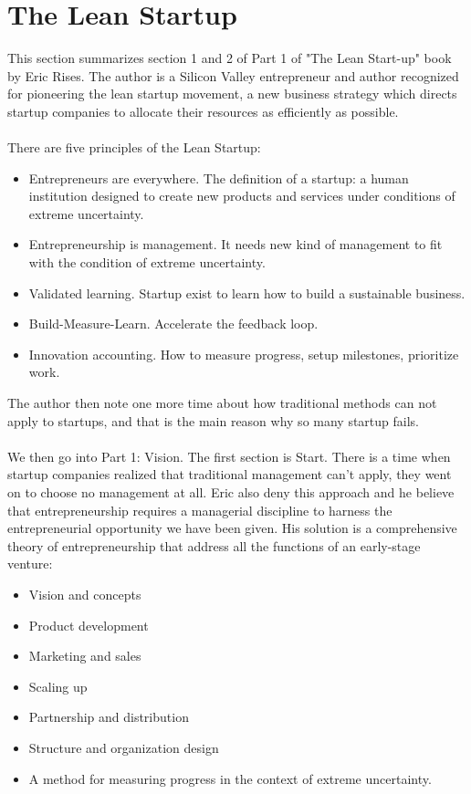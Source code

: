 \documentclass[a4paper, 11pt]{article} %
\begin{document}
\section*{The Lean Startup}
This section summarizes section 1 and 2 of Part 1 of "The Lean Start-up" book by Eric Rises. The author is a Silicon Valley entrepreneur and author recognized for pioneering the lean startup movement, a new business strategy which directs startup companies to allocate their resources as efficiently as possible.
\\
\\
There are five principles of the Lean Startup:
\begin{itemize}
\item{Entrepreneurs are everywhere. The definition of a startup: a human institution designed to create new products and services under conditions of extreme uncertainty.}
\item{Entrepreneurship is management. It needs new kind of management to fit with the condition of extreme uncertainty.}
\item{Validated learning. Startup exist to learn how to build a sustainable business.}
\item{Build-Measure-Learn. Accelerate the feedback loop.}
\item{Innovation accounting. How to measure progress, setup milestones, prioritize work.}
\end{itemize}
The author then note one more time about how traditional methods can not apply to startups, and that is the main reason why so many startup fails.
\\
\\
We then go into Part 1: Vision. The first section is Start. There is a time when startup companies realized that traditional management can't apply, they went on to choose no management at all. Eric also deny this approach and he believe that entrepreneurship requires a managerial discipline to harness the entrepreneurial opportunity we have been given. His solution is a comprehensive theory of entrepreneurship that address all the functions of an early-stage venture:
\begin{itemize}
\item{Vision and concepts}
\item{Product development}
\item{Marketing and sales}
\item{Scaling up}
\item{Partnership and distribution }
\item{Structure and organization design}
\item{A method for measuring progress in the context of extreme uncertainty.}
\end{itemize}
\end{document}
